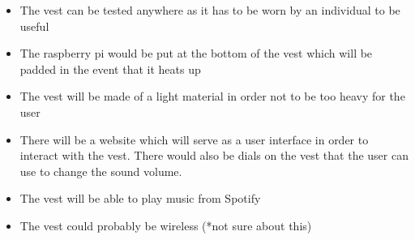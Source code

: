 
\begin{itemize}
  \item The vest can be tested anywhere as it has to be worn by an individual to be useful
  \item The raspberry pi would be put at the bottom of the vest which will be padded in the event that it heats up 
  \item The vest will be made of a light material in order not to be too heavy for the user
  \item There will be a website which will serve as a user interface in order to interact with the vest. There would also be dials on the vest that the user can use to change the sound volume.
  \item The vest will be able to play music from Spotify 
  \item The vest could probably be wireless (*not sure about this)
\end{itemize}